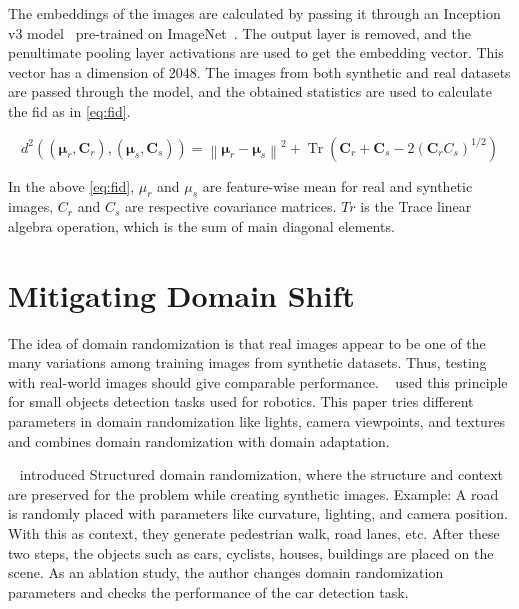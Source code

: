 The embeddings of the images are calculated by passing it through an Inception v3 model~\cite{Szegedy2016RethinkingTI} pre-trained on ImageNet~\cite{Deng2009ImageNetAL}.
The output layer is removed, and the penultimate pooling layer activations are used to get the embedding vector.
This vector has a dimension of 2048.
The images from both synthetic and real datasets are passed through the model, and the obtained statistics are used to calculate the \gls{fid} as in \autoref{eq:fid}.

\begin{equation}
    d^{2}\left((\boldsymbol{\mu}_{r}, \boldsymbol{C}_{r}),\left(\boldsymbol{\mu}_{s}, \boldsymbol{C}_{s}\right)\right)=\left\|\boldsymbol{\mu}_{r}-\boldsymbol{\mu}_{s}\right\|^{2}+\operatorname{Tr}\left(\boldsymbol{C}_{r}+\boldsymbol{C}_{s}-2\left(\boldsymbol{C}_{r} {C}_{s}\right)^{1 / 2}\right)
    \label{eq:fid}
\end{equation}

In the above \autoref{eq:fid}, $\mu_r$ and $\mu_s$ are feature-wise mean for real and synthetic images, $C_r$ and $C_s$ are respective covariance matrices.
$Tr$ is the Trace linear algebra operation, which is the sum of main diagonal elements.


\section{Mitigating Domain Shift}\label{sec:mitigating_domain_shift}

The idea of domain randomization is that real images appear to be one of the many variations among training images from synthetic datasets.
Thus, testing with real-world images should give comparable performance.
~\cite{tobin2017domain} used this principle for small objects detection tasks used for robotics.
This paper tries different parameters in domain randomization like lights, camera viewpoints, and textures and combines domain randomization with domain adaptation.

~\cite{prakash2020structured} introduced Structured domain randomization, where the structure and context are preserved for the problem while creating synthetic images.
Example: A road is randomly placed with parameters like curvature, lighting, and camera position.
With this as context, they generate pedestrian walk, road lanes, etc.
After these two steps, the objects such as cars, cyclists, houses, buildings are placed on the scene.
As an ablation study, the author changes domain randomization parameters and checks the performance of the car detection task.

